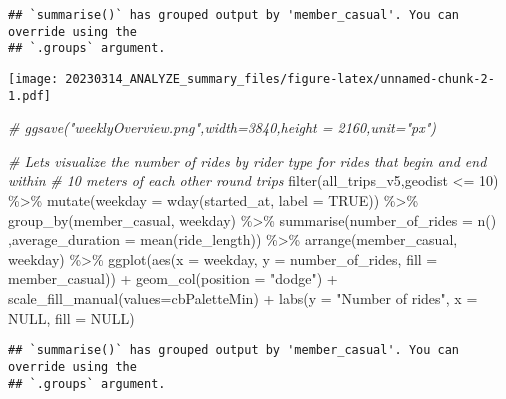 \documentclass[
]{article}
\newenvironment{Shaded}{\begin{snugshade}}{\end{snugshade}}
\newcommand{\AttributeTok}[1]{\textcolor[rgb]{0.77,0.63,0.00}{#1}}
\newcommand{\CommentTok}[1]{\textcolor[rgb]{0.56,0.35,0.01}{\textit{#1}}}
\newcommand{\ConstantTok}[1]{\textcolor[rgb]{0.00,0.00,0.00}{#1}}
\newcommand{\DecValTok}[1]{\textcolor[rgb]{0.00,0.00,0.81}{#1}}
\newcommand{\FunctionTok}[1]{\textcolor[rgb]{0.00,0.00,0.00}{#1}}
\newcommand{\NormalTok}[1]{#1}
\newcommand{\SpecialCharTok}[1]{\textcolor[rgb]{0.00,0.00,0.00}{#1}}
\newcommand{\StringTok}[1]{\textcolor[rgb]{0.31,0.60,0.02}{#1}}
\begin{document}
\begin{verbatim}
## `summarise()` has grouped output by 'member_casual'. You can override using the
## `.groups` argument.
\end{verbatim}

\texttt{[image: 20230314\_ANALYZE\_summary\_files/figure-latex/unnamed-chunk-2-1.pdf]}

\begin{Shaded}
\begin{Highlighting}[]
\CommentTok{\# ggsave("weeklyOverview.png",width=3840,height = 2160,unit="px")}

\CommentTok{\# Let\textquotesingle{}s visualize the number of rides by rider type for rides that begin and end within }
\CommentTok{\# 10 meters of each other \textquotesingle{}round trips\textquotesingle{}}
\FunctionTok{filter}\NormalTok{(all\_trips\_v5,geodist }\SpecialCharTok{\textless{}=} \DecValTok{10}\NormalTok{) }\SpecialCharTok{\%\textgreater{}\%} 
  \FunctionTok{mutate}\NormalTok{(}\AttributeTok{weekday =} \FunctionTok{wday}\NormalTok{(started\_at, }\AttributeTok{label =} \ConstantTok{TRUE}\NormalTok{)) }\SpecialCharTok{\%\textgreater{}\%} 
  \FunctionTok{group\_by}\NormalTok{(member\_casual, weekday) }\SpecialCharTok{\%\textgreater{}\%} 
  \FunctionTok{summarise}\NormalTok{(}\AttributeTok{number\_of\_rides =} \FunctionTok{n}\NormalTok{()}
\NormalTok{            ,}\AttributeTok{average\_duration =} \FunctionTok{mean}\NormalTok{(ride\_length)) }\SpecialCharTok{\%\textgreater{}\%} 
  \FunctionTok{arrange}\NormalTok{(member\_casual, weekday)  }\SpecialCharTok{\%\textgreater{}\%} 
  \FunctionTok{ggplot}\NormalTok{(}\FunctionTok{aes}\NormalTok{(}\AttributeTok{x =}\NormalTok{ weekday, }\AttributeTok{y =}\NormalTok{ number\_of\_rides, }\AttributeTok{fill =}\NormalTok{ member\_casual)) }\SpecialCharTok{+}
  \FunctionTok{geom\_col}\NormalTok{(}\AttributeTok{position =} \StringTok{"dodge"}\NormalTok{) }\SpecialCharTok{+} 
  \FunctionTok{scale\_fill\_manual}\NormalTok{(}\AttributeTok{values=}\NormalTok{cbPaletteMin) }\SpecialCharTok{+}
  \FunctionTok{labs}\NormalTok{(}\AttributeTok{y =} \StringTok{"Number of rides"}\NormalTok{, }\AttributeTok{x =} \ConstantTok{NULL}\NormalTok{, }\AttributeTok{fill =} \ConstantTok{NULL}\NormalTok{)}
\end{Highlighting}
\end{Shaded}

\begin{verbatim}
## `summarise()` has grouped output by 'member_casual'. You can override using the
## `.groups` argument.
\end{verbatim}
\end{document}
